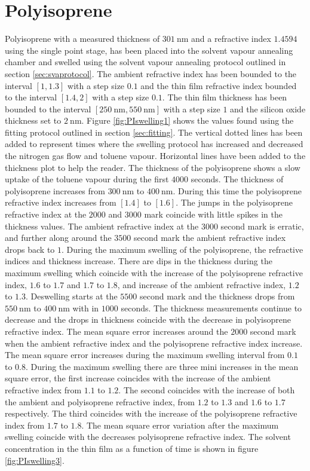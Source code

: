 \documentclass[MasterThesisMain.tex]{subfiles}
\begin{document}
\section{Polyisoprene}
Polyisoprene with a measured thickness of $\SI{301}{\nano\meter}$ and a refractive index $1.4594$ using the single point stage, has been placed into the solvent vapour annealing chamber and swelled using the solvent vapour annealing protocol outlined in section \ref{sec:svaprotocol}. The ambient refractive index has been bounded to the interval $[1,1.3]$ with a step size $0.1$ and the thin film refractive index bounded to the interval $[1.4,2]$ with a step size $0.1$. The thin film thickness has been bounded to the interval $[\SI{250}{\nano\meter},\SI{550}{\nano\meter}]$ with a step size $1$ and the silicon oxide thickness set to $\SI{2}{\nano\meter}$. Figure \ref{fig:PIswelling1} shows the values found using the fitting protocol outlined in section \ref{sec:fitting}. The vertical dotted lines has been added to represent times where the swelling protocol has increased and decreased the nitrogen gas flow and toluene vapour. Horizontal lines have been added to the thickness plot to help the reader. The thickness of the polyisoprene shows a slow uptake of the toluene vapour during the first $4000$ seconds. The thickness of polyisoprene increases from $\SI{300}{\nano\meter}$ to $\SI{400}{\nano\meter}$. During this time the polyisoprene refractive index increases from $[1.4]$ to $[1.6]$. The jumps in the polyisoprene refractive index at the $2000$ and $3000$ mark coincide with little spikes in the thickness values. The ambient refractive index at the $3000$ second mark is erratic, and further along around the $3500$ second mark the ambient refractive index drops back to $1$. During the maximum swelling of the polyisoprene, the refractive indices and thickness increase. There are dips in the thickness during the maximum swelling which coincide with the increase of the polyisoprene refractive index, $1.6$ to $1.7$ and $1.7$ to $1.8$, and increase of the ambient refractive index, $1.2$ to $1.3$. Deswelling starts at the $5500$ second mark and the thickness drops from $\SI{550}{\nano\meter}$ to $\SI{400}{\nano\meter}$ with in $1000$ seconds. The thickness measurements continue to decrease and the drops in thickness coincide with the decrease in polyisoprene refractive index. The mean square error increases around the $2000$ second mark when the ambient refractive index and the polyisoprene refractive index increase. The mean square error increases during the maximum swelling interval from $0.1$ to $0.8$. During the maximum swelling there are three mini increases in the mean square error, the first increase coincides with the increase of the ambient refractive index from $1.1$ to $1.2$. The second coincides with the increase of both the ambient and polyisoprene refractive index, from $1.2$ to $1.3$ and $1.6$ to $1.7$ respectively. The third coincides with the increase of the polyisoprene refractive index from $1.7$ to $1.8$. The mean square error variation after the maximum swelling coincide with the decreases polyisoprene refractive index. The solvent concentration in the thin film as a function of time is shown in figure \ref{fig:PIswelling3}.
\end{document}
